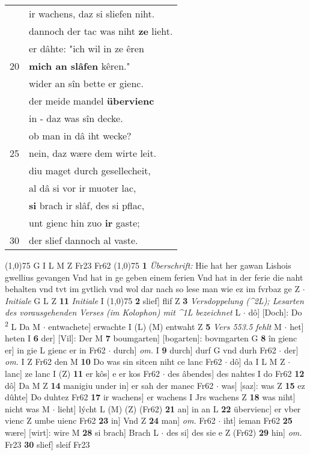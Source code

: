 \documentclass[8pt,a4paper,notitlepage]{article}
\begin{document}
\begin{table}[ht]
\begin{minipage}[t]{0.5\linewidth}
\begin{tabular}{rl}
 & ir wachens, daz si sliefen niht.\\ 
 & dannoch der tac was niht \textbf{ze} lieht.\\ 
 & er dâhte: "ich wil in ze êren\\ 
20 & \textbf{mich an slâfen} kêren."\\ 
 & wider an sîn bette er gienc.\\ 
 & der meide mandel \textbf{übervienc}\\ 
 & in - daz was sîn decke.\\ 
 & ob man in dâ iht wecke?\\ 
25 & nein, daz wære dem wirte leit.\\ 
 & diu maget durch gesellecheit,\\ 
 & al dâ si vor ir muoter lac,\\ 
 & \textbf{si} brach ir slâf, des si pflac,\\ 
 & unt gienc hin zuo \textbf{ir} gaste;\\ 
30 & der slief dannoch al vaste.\\ 
\end{tabular}
\scriptsize
\line(1,0){75} \newline
G I L M Z Fr23 Fr62 \newline
\line(1,0){75} \newline
\textbf{1} \textit{Überschrift:} Hie hat her gawan Lishois gwellius gevangen Vnd hat in ge geben einem ferien Vnd hat in der ferie die naht behalten vnd tvt im gvtlich vnd wol dar nach so lese man wie ez im fvrbaz ge Z   $\cdot$ \textit{Initiale} G L Z  \textbf{11} \textit{Initiale} I  \newline
\line(1,0){75} \newline
\textbf{2} slief] flif Z \textbf{3} \textit{Versdoppelung (\textasciicircum2L); Lesarten des vorausgehenden Verses (im Kolophon) mit \textasciicircum1L bezeichnet} L   $\cdot$ dô] [Doch]: Do \textsuperscript{2}\hspace{-1.3mm} L Da M  $\cdot$ entwachete] erwachte I (L) (M) entwaht Z \textbf{5} \textit{Vers 553.5 fehlt} M   $\cdot$ het] heten I \textbf{6} der] [Vil]: Der M \textbf{7} boumgarten] [bogarten]: bovmgarten G \textbf{8} în gienc er] in gie L gienc er in Fr62  $\cdot$ durch] \textit{om.} I \textbf{9} durch] durf G vnd durh Fr62  $\cdot$ der] \textit{om.} I Z Fr62 den M \textbf{10} Do was sin sitcen niht ce lanc Fr62  $\cdot$ dô] da I L M Z  $\cdot$ lanc] ze lanc I (Z) \textbf{11} er kôs] e er kos Fr62  $\cdot$ des âbendes] des nahtes I do Fr62 \textbf{12} dô] Da M Z \textbf{14} manigiu under in] er sah der manec Fr62  $\cdot$ was] [saz]: was Z \textbf{15} ez dûhte] Do duhtez Fr62 \textbf{17} ir wachens] er wachens I Jrs wachens Z \textbf{18} was niht] nicht was M  $\cdot$ lieht] lýcht L (M) (Z) (Fr62) \textbf{21} an] in an L \textbf{22} übervienc] er vber vienc Z umbe uienc Fr62 \textbf{23} in] Vnd Z \textbf{24} man] \textit{om.} Fr62  $\cdot$ iht] ieman Fr62 \textbf{25} wære] [wirt]: wire M \textbf{28} si brach] Brach L  $\cdot$ des si] des sie e Z (Fr62) \textbf{29} hin] \textit{om.} Fr23 \textbf{30} slief] sleif Fr23 \newline

\end{minipage}
\end{table}
\end{document}
